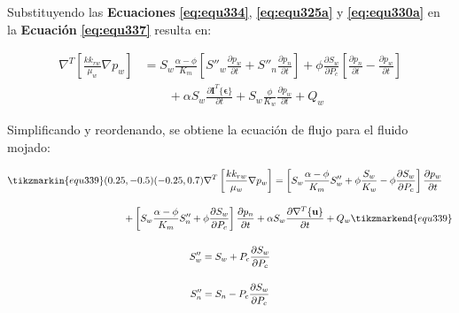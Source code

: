 Substituyendo las \textbf{Ecuaciones} \textbf{\ref{eq:equ334}}, \textbf{\ref{eq:equ325a}} y \textbf{\ref{eq:equ330a}} en la \textbf{Ecuación} \textbf{\ref{eq:equ337}} resulta en:\bigskip

\begin{ceqn}
\begin{align}\label{eq:equ338}
 \nabla^T \left[\frac{k k_{rw}}{\mu_{w}}\nabla p_w\right] &= S_w \frac{\alpha - \phi}{K_m}\left[S''_w\frac{\partial p_w}{\partial t} + S''_n\frac{\partial p_n}{\partial t}\right] + \phi\frac{\partial S_w}{\partial P_c}\left[\frac{\partial p_n}{\partial t} - \frac{\partial p_w}{\partial t} \right] \nonumber \\[12pt]
  &\qquad {} + \alpha S_w\frac{\partial \mathbf{I}^T \{\mathbf{\epsilon}\}}{\partial t} +S_w\frac{\phi}{K_w}\frac{\partial p_w}{\partial t} + Q_w
\end{align}
\end{ceqn}
\bigskip

Simplificando y reordenando, se obtiene la ecuación de flujo para el fluido mojado:
\begin{ceqn} 
\begin{subequations} \label{eq:equ339} 
\begin{gather}
\begin{multlined}
\tikzmarkin{equ339}(0.25,-0.5)(-0.25,0.7)
\nabla^T \left[\frac{k k_{rw}}{\mu_{w}}\nabla p_w\right] = \left[S_w \frac{\alpha - \phi}{K_m}S''_w + \phi\frac{S_w}{K_w} - \phi\frac{\partial S_w}{\partial P_c}\right]\frac{\partial p_w}{\partial t} \\[10pt]
+ \left[S_w \frac{\alpha - \phi}{K_m}S''_n + \phi\frac{\partial S_w}{\partial P_c}\right]\frac{\partial p_n}{\partial t} +\alpha S_w\frac{\partial \nabla^T \{\mathbf{u}\}}{\partial t} + Q_w \tikzmarkend{equ339} \label{eq:equ339a}
\end{multlined}\\[12pt]
S''_w = S_w + P_c\frac{\partial S_w}{\partial P_c}  \label{eq:equ339b}\\[12pt]
S''_n = S_n - P_c\frac{\partial S_w}{\partial P_c}  \label{eq:equ339c}
\end{gather}  
\end{subequations} 
\end{ceqn}
\bigskip

